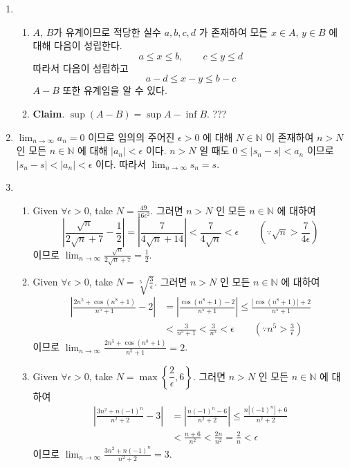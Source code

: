 \documentclass[12pt]{report}
\newcommand{\numl}[1]{\item[\large\textbf{\sffamily #1.}]}
\newcommand{\num}[1]{\item[\textbf{\sffamily #1}]}
\newcommand{\bb}[1]{\mathbb{#1}}
\newcommand{\ra}{\rightarrow}
\newcommand{\abs}[1]{\left|#1\right|}
\newcommand{\ds}{\displaystyle}
\begin{document}
\begin{enumerate}
\numl{3}
\begin{enumerate}
	\num{(1)} $A$, $B$가 유계이므로 적당한 실수 $a, b, c, d$ 가 존재하여 모든 $x \in A$, $y\in B$ 에 대해 다음이 성립한다. $$a\leq x\leq b, \qquad c\leq y\leq d$$ 따라서 다음이 성립하고 $$a-d\leq x-y\leq b-c$$ $A-B$ 또한 유계임을 알 수 있다.
	\num{(2)} \textbf{Claim}. $\sup(A-B) = \sup A-\inf B$. ???
\end{enumerate}

\numl{4} $\ds \lim_{n \ra \infty} a_n = 0$ 이므로 임의의 주어진 $\epsilon > 0$ 에 대해 $N\in\bb{N}$ 이 존재하여 $n>N$ 인 모든 $n\in \bb{N}$ 에 대해 $\abs{a_n} < \epsilon$ 이다. $n>N$ 일 때도 $0\leq\abs{s_n-s} < a_n$ 이므로 $\abs{s_n-s} < \abs{a_n} <\epsilon$ 이다. 따라서 $\ds \lim_{n \ra \infty} s_n = s$.

\numl{5}
\begin{enumerate}
	\num{(1)} Given $\forall \epsilon > 0$, take $N = \ds \frac{49}{16\epsilon^2}$. 그러면 $n>N$ 인 모든 $n\in\bb{N}$ 에 대하여\\
	$$\abs{\frac{\sqrt{n}}{2\sqrt{n}+7} - \frac{1}{2}} = \abs{\frac{7}{4\sqrt{n}+14}} < \frac{7}{4\sqrt{n}} < \epsilon \qquad \left(\because \sqrt{n} > \frac{7}{4\epsilon}\right)$$
	이므로 $\ds \lim_{n \ra \infty} \frac{\sqrt{n}}{2\sqrt{n}+7} = \frac{1}{2}$.
	
	\num{(2)} Given $\forall \epsilon > 0$, take $N = \ds \sqrt[5]{\frac{3}{\epsilon}}$. 그러면 $n>N$ 인 모든 $n\in\bb{N}$ 에 대하여\\
	$$\begin{aligned}
		\abs{\frac{2n^5 +\cos(n^8 +1)}{n^5+1} - 2} &= \abs{\frac{\cos(n^8+1) - 2}{n^5+1}} \leq \frac{\abs{\cos(n^8+1)} + 2}{n^5+1} \\&< \frac{3}{n^5+1} < \frac{3}{n^5} < \epsilon \qquad \left(\because n^5 > \frac{3}{\epsilon}\right)
	\end{aligned}$$
	이므로 $\ds \lim_{n \ra \infty} \frac{2n^5 +\cos(n^8 +1)}{n^5+1} = 2$.
	\num{(3)} Given $\forall \epsilon > 0$, take $N = \max\left\{\dfrac{2}{\epsilon}, 6\right\}$. 그러면 $n>N$ 인 모든 $n\in\bb{N}$ 에 대하여\\
	$$\begin{aligned}
		\abs{\frac{3n^2+n(-1)^n}{n^2+2} - 3} &= \abs{\frac{n(-1)^n - 6}{n^2+2}} \leq \frac{n\abs{(-1)^n} + 6}{n^2+2} \\&< \frac{n+6}{n^2} < \frac{2n}{n^2} = \frac{2}{n} < \epsilon
	\end{aligned}$$
	이므로 $\ds \lim_{n \ra \infty} \frac{3n^2+n(-1)^n}{n^2+2} = 3$.
\end{enumerate}


\end{enumerate}
\end{document}
